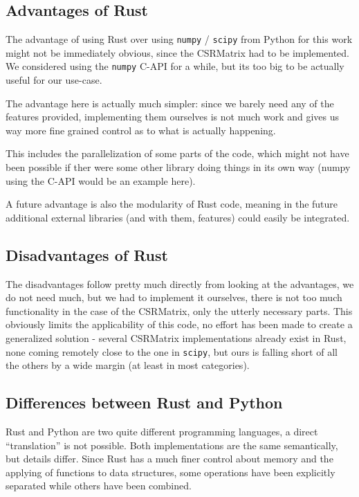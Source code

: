 \subsection{Advantages of Rust}

The advantage of using Rust over using \verb|numpy| / \verb|scipy| from Python
for this work might not be immediately obvious, since the CSRMatrix had to be
implemented. We considered using the \verb|numpy| C-API for a while, but its
too big to be actually useful for our use-case.

The advantage here is actually much simpler: since we barely need any of the
features provided, implementing them ourselves is not much work and gives us
way more fine grained control as to what is actually happening.

This includes the parallelization of some parts of the code, which might not
have been possible if ther were some other library doing things in its own way
(numpy using the C-API would be an example here).

A future advantage is also the modularity of Rust code, meaning in the future
additional external libraries (and with them, features) could easily be integrated.


\subsection{Disadvantages of Rust}

The disadvantages follow pretty much directly from looking at the advantages,
we do not need much, but we had to implement it ourselves, there is not
too much functionality in the case of the CSRMatrix, only the utterly necessary
parts. This obviously limits the applicability of this code, no effort has been
made to create a generalized solution - several CSRMatrix implementations
already exist in Rust, none coming remotely close to the one in \verb|scipy|,
but ours is falling short of all the others by a wide margin (at least in most
categories).



\subsection{Differences between Rust and Python}\label{sec:differences}

Rust and Python are two quite different programming languages, a direct
``translation'' is not possible. Both implementations are the same semantically,
but details differ. Since Rust has a much finer control about memory and the
applying of functions to data structures, some operations have been explicitly
separated while others have been combined.

